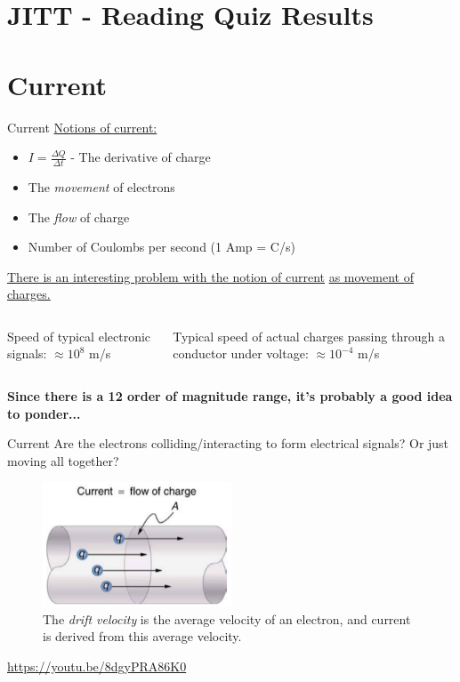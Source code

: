 \documentclass{beamer}
\begin{document}
\section{JITT - Reading Quiz Results}

\section{Current}

\begin{frame}{Current}
\underline{Notions of current:}
\begin{itemize}
	\item $I = \frac{\Delta Q}{\Delta t}$ - The derivative of charge
	\item The \textit{movement} of electrons
	\item The \textit{flow} of charge
	\item Number of Coulombs per second (1 Amp = C/s)
\end{itemize}
\underline{There is an interesting problem with the notion of current} \underline{as movement of charges.} \\ \vspace{0.5cm}
\begin{columns}[T]
\begin{column}{0.5\textwidth}
Speed of typical electronic signals: $\approx 10^{8}$ m/s
\end{column}
\begin{column}{0.5\textwidth}
Typical speed of actual charges passing through a conductor under voltage: $\approx 10^{-4}$ m/s
\end{column}
\end{columns} \vspace{0.25cm}
\textbf{Since there is a 12 order of magnitude range, it's probably a good idea to ponder...}
\end{frame}

\begin{frame}{Current}
\small
Are the electrons colliding/interacting to form electrical signals?  Or just moving all together?
\begin{figure}
\includegraphics[width=0.5\textwidth]{figures/current1.png}
\caption{\label{fig:current1} The \textit{drift velocity} is the average velocity of an electron, and current is derived from this average velocity.}
\end{figure}
\url{https://youtu.be/8dgyPRA86K0}
\end{frame}
\end{document}
